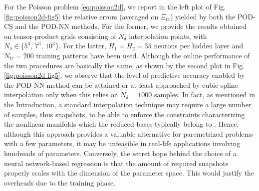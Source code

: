 \documentclass{elsarticle}
\numberwithin{equation}{section}
\theoremstyle{theorem}
\theoremstyle{definition}
\theoremstyle{remark}
\theoremstyle{proposition}
\numberwithin{figure}{section}
\begin{document}
		For the Poisson problem \eqref{eq:poisson2d}, we report in the left plot of Fig. \ref{fig:poisson2d-fig5} the relative errors (averaged on $\Xi_{te}$) yielded by both the POD-CS and the POD-NN methods. For the former, we provide the results obtained on tensor-product grids consisting of $N_{\delta}$ interpolation points, with $N_{\delta} \in \lbrace 5^3, \, 7^3, \, 10^3 \rbrace$. For the latter, $H_1 = H_2 = 35$ neurons per hidden layer and $N_{tr} = 200$ training patterns have been used. Although the online performance of the two procedures are basically the same, as shown by the second plot in Fig. \ref{fig:poisson2d-fig5}, we observe that the level of predictive accuracy enabled by the POD-NN method can be attained or at least approached by cubic spline interpolation only when this relies on $N_{\delta} = 1000$ samples. In fact, as mentioned in the Introduction, a standard interpolation technique may require a large number of samples, thus snapshots, to be able to enforce the constraints characterizing the nonlinear manifolds which the reduced bases typically belong to \cite{Ams10}. Hence, although this approach provides a valuable alternative for paremetrized problems with a few parameters, it may be unfeasible in real-life applications involving hundreads of parameters. Conversely, the secret hope behind the choice of a neural network-based regression is that the amount of required snapshots properly scales with the dimension of the parameter space. This would justify the overheads due to the training phase.
		
\end{document}
